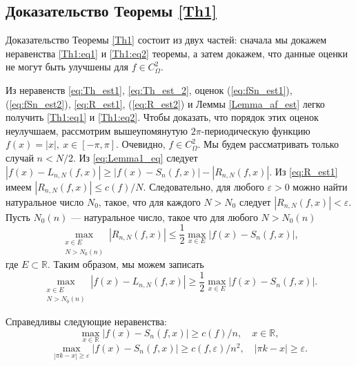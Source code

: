 \subsection{Доказательство Теоремы \ref{Th1}}
Доказательство Теоремы \ref{Th1} состоит из двух частей: сначала мы докажем неравенства \eqref{Th1:eq1} и \eqref{Th1:eq2} теоремы, а затем докажем, что данные оценки не могут быть улучшены для $f \in C_{\Omega}^{2}$. 	

Из неравенств \eqref{eq:Th_est1}, \eqref{eq:Th_est_2}, оценок
(\ref{eq:fSn_est1}), (\ref{eq:fSn_est2}), %
\eqref{eq:R_est1}, (\ref{eq:R_est2}) %
и Леммы \ref{Lemma_af_est} легко получить \eqref{Th1:eq1} и \eqref{Th1:eq2}.
Чтобы доказать, что порядок этих оценок неулучшаем, рассмотрим вышеупомянутую $2\pi$-периодическую функцию
$f(x) = |x|,\ x \in [-\pi,\pi]$.
Очевидно, $f \in C_{\Omega}^{2}$.
Мы будем рассматривать только случай $n < N/2$.	
Из \eqref{eq:Lemma1_eq} следует
$
\left|f(x) - L_{n,N}(f,x)\right| \geq \left|f(x) - S_n(f,x)\right| - \left|R_{n,N}(f,x)\right|.
$
Из \eqref{eq:R_est1} имеем $\left|R_{n,N}(f,x)\right| \leq c(f)/N$. Следовательно, для любого $\varepsilon > 0$
можно найти натуральное число $N_0$, такое, что для каждого $N > N_0$ следует $\left|R_{n,N}(f,x)\right| < \varepsilon$.
Пусть $N_0(n)$ --- натуральное число, такое что для любого $N > N_0(n)$
$$
\max_{\substack{x \in E \\ N > N_0(n)}} \left|R_{n,N}(f,x)\right| \leq \frac12 \max_{x \in E} \left|f(x) - S_{n}(f,x)\right|,
$$
где $E \subset \mathbb{R}$.
Таким образом, мы можем записать
\begin{equation} \label{maxLgeqmaxRn}
\max_{\substack{x \in E \\ N > N_0(n)}}\left|f(x) - L_{n,N}(f,x)\right| \geq \frac12 \max_{x \in E}\left|f(x) - S_n(f,x)\right|.
\end{equation}
\begin{lemma}
	Справедливы следующие неравенства:
	$$
	\max_{x \in \mathbb{R}}\left|f(x) - S_n(f,x)\right| \geq {c(f)}/{n},\quad x \in \mathbb{R},
	$$
	$$
	\max_{\left|\pi k - x\right| \geq \varepsilon} \left|f(x) - S_n(f,x)\right| \geq {c(f, \varepsilon)}/{n^2},\quad \left|\pi k - x\right| \geq \varepsilon.
	$$
\end{lemma}
